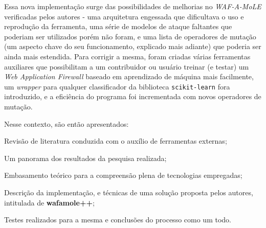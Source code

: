Essa nova implementação surge das possibilidades de melhorias no \textit{WAF-A-MoLE} verificadas pelos autores - uma arquitetura engessada que dificultava o uso e reprodução da ferramenta, uma série de modelos de ataque faltantes que poderiam ser utilizados porém não foram, e uma lista de operadores de mutação (um aspecto chave do seu funcionamento, explicado mais adiante) que poderia ser ainda mais estendida. Para corrigir a mesma, foram criadas várias ferramentas auxiliares que possibilitam a um contribuidor ou usuário treinar (e testar) um \textit{Web Application Firewall} baseado em aprendizado de máquina mais facilmente, um \textit{wrapper} para qualquer classificador da biblioteca \verb+scikit-learn+ fora introduzido, e a eficiência do programa foi incrementada com novos operadores de mutação.

Nesse contexto, são então apresentados: 
\begin{alineas}
\item Revisão de literatura conduzida com o auxílio de ferramentas externas;
\item Um panorama dos resultados da pesquisa realizada;
\item Embasamento teórico para a compreensão plena de tecnologias empregadas;
\item Descrição da implementação, e técnicas de uma solução proposta pelos autores, intitulada de \textbf{wafamole++};
\item Testes realizados para a mesma e conclusões do processo como um todo.
\end{alineas}


\bigskip
